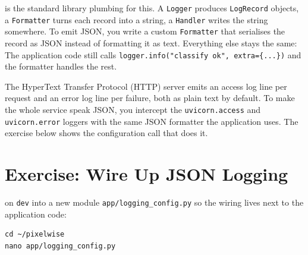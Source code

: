  is the standard library
plumbing for this. A \texttt{Logger} produces \texttt{LogRecord}
objects, a \texttt{Formatter} turns each record into a string, a
\texttt{Handler} writes the string somewhere. To emit JSON, you write
a custom \texttt{Formatter} that serialises the record as JSON instead
of formatting it as text. Everything else stays the same: The
application code still calls \texttt{logger.info("classify ok",
extra=\{...\})} and the formatter handles the rest.

The HyperText Transfer Protocol (HTTP) server emits an access log line
per request and an error log line per failure, both as plain text by
default. To make the whole service speak JSON, you intercept the
\texttt{uvicorn.access} and \texttt{uvicorn.error} loggers with the
same JSON formatter the application uses. The exercise below shows
the configuration call that does it.




\newpage
\section{Exercise: Wire Up JSON Logging}

 on \texttt{dev} into a new module
\texttt{app/logging\_config.py} so the wiring lives next to the
application code:

\begin{verbatim}
cd ~/pixelwise
nano app/logging_config.py
\end{verbatim}


